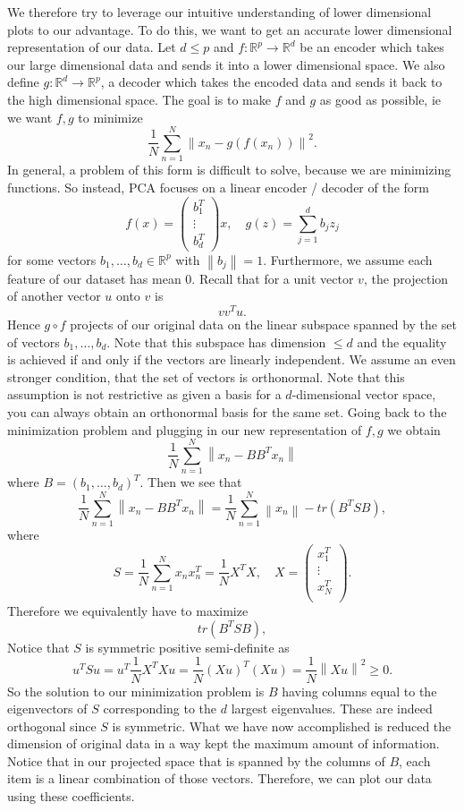 \documentclass[12pt]{article}
\newcommand{\R}{\mathbb{R}}
\newcommand{\norm}[1]{\left\lVert#1\right\rVert}
\begin{document}
We therefore try to leverage our intuitive understanding of lower dimensional plots to our advantage. To do this, we want to get an accurate lower dimensional representation of our data. Let $d \leq p$ and $f:\R^p \to \R^d$ be an encoder which takes our large dimensional data and sends it into a lower dimensional space. We also define $g:\R^d \to \R^p$, a decoder which takes the encoded data and sends it back to the high dimensional space. The goal is to make $f$ and $g$ as good as possible, ie we want $f,g$ to minimize
\[
    \frac{1}{N} \sum_{n = 1}^{N} \norm{x_n - g(f(x_n))}^2.
\]
In general, a problem of this form is difficult to solve, because we are minimizing functions. So instead, PCA focuses on a linear encoder / decoder of the form
\[
    f(x) = \begin{pmatrix}
        b_1^T \\
        \vdots \\
        b_d^T
    \end{pmatrix}x, 
    \quad g(z) = \sum_{j = 1}^{d}b_j z_j
\]
for some vectors $b_1, \dots, b_d \in \R^p$ with $\norm{b_j}=1$. Furthermore, we assume each feature of our dataset has mean 0. Recall that for a unit vector $v$, the projection of another vector $u$ onto $v$ is
\[
vv^Tu.
\]
Hence $g \circ f$ projects of our original data on the linear subspace spanned by the set of vectors $b_1, \dots, b_d$. Note that this subspace has dimension $\le d$ and the equality is achieved if and only if the vectors are linearly independent. We assume an even stronger condition, that the set of vectors is orthonormal. Note that this assumption is not restrictive as given a basis for a $d$-dimensional vector space, you can always obtain an orthonormal basis for the same set. Going back to the minimization problem and plugging in our new representation of $f, g$ we obtain
\[
    \frac{1}{N} \sum_{n = 1}^{N} \norm{x_n - BB^Tx_n}
\]
where $B = (b_1, \dots, b_d)^T$. Then we see that
\[
\frac{1}{N} \sum_{n = 1}^{N} \norm{x_n - BB^Tx_n} = \frac{1}{N} \sum_{n = 1}^{N} \norm{x_n}- tr(B^T S B),
\]
where
\[
S = \frac{1}{N} \sum_{n = 1}^{N} x_n x_n^T = \frac{1}{N} X^T X, \quad X = \begin{pmatrix}
    x_1^T\\
    \vdots \\ 
    x_N^T\\
\end{pmatrix}.
\]
Therefore we equivalently have to maximize
\[
tr(B^T S B),
\]
Notice that $S$ is symmetric positive semi-definite as
\[
u^TSu = u^T \frac{1}{N} X^T X u = \frac{1}{N} (Xu)^T(Xu) = \frac{1}{N} \norm{Xu}^2 \ge 0.
\]
So the solution to our minimization problem is $B$ having columns equal to the eigenvectors of $S$ corresponding to the $d$ largest eigenvalues. These are indeed orthogonal since $S$ is symmetric. What we have now accomplished is reduced the dimension of original data in a way kept the maximum amount of information. Notice that in our projected space that is spanned by the columns of $B$, each item is a linear combination of those vectors. Therefore, we can plot our data using these coefficients.
\end{document}
